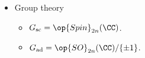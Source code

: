 \documentclass{article}
\begin{document}
\begin{itemize}
\begin{itemize}
		\item Fundamental representations are $L_{\omega_i}=\land^i\CC^{2n+1}$ for $i<n$ and the degree pieces of the standard Clifford module.
		\item Exponents are $\{1,3,\ldots,2n-3,2n-1\}\sqcup\{n\}$.
	\end{itemize}
	\item Group theory
	\begin{itemize}
		\item $G_{\mathrm{sc}}=\op{Spin}_{2n}(\CC)$.
		\item $G_{\mathrm{ad}}=\op{SO}_{2n}(\CC)/\{\pm1\}$.
	\end{itemize}
\end{itemize}
\end{document}
